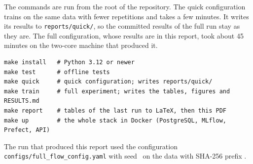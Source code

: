 The commands are run from the root of the repository. The quick configuration trains on the same data with fewer repetitions and takes a few minutes. It writes its results to \texttt{reports/quick/}, so the committed results of the full run stay as they are. The full configuration, whose results are in this report, took about 45 minutes on the two-core machine that produced it.

\begin{verbatim}
make install   # Python 3.12 or newer
make test      # offline tests
make quick     # quick configuration; writes reports/quick/
make train     # full experiment; writes the tables, figures and RESULTS.md
make report    # tables of the last run to LaTeX, then this PDF
make up        # the whole stack in Docker (PostgreSQL, MLflow, Prefect, API)
\end{verbatim}

The run that produced this report used the configuration \texttt{configs/full\_flow\_config.yaml} with seed~\runSeed{} on the data with SHA-256 prefix \texttt{\runDataSha}.
